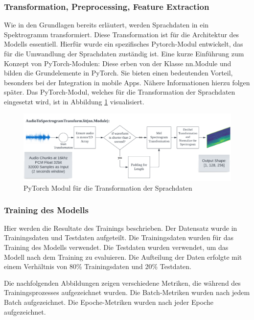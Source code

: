 \documentclass[11pt,a4paper]{article}
\begin{document}
\subsubsection{Transformation, Preprocessing, Feature Extraction}
Wie in den Grundlagen bereits erläutert, werden Sprachdaten in ein Spektrogramm transformiert. 
Diese Transformation ist für die Architektur des Modells essentiell. Hierfür wurde ein spezifisches 
Pytorch-Modul entwickelt, das für die Umwandlung der Sprachdaten zuständig ist. Eine kurze 
Einführung zum Konzept von PyTorch-Modulen: Diese erben von der Klasse nn.Module und bilden die 
Grundelemente in PyTorch. Sie bieten einen bedeutenden Vorteil, besonders bei der Integration in 
mobile Apps. Nähere Informationen hierzu folgen später. Das PyTorch-Modul, welches für die 
Transformation der Sprachdaten eingesetzt wird, ist in Abbildung \ref{fig:transform} visualisiert.

\begin{figure}[H]
	\centering
	\includegraphics[width=1.0\linewidth]{img/transform.pdf}
	\caption{PyTorch Modul für die Transformation der Sprachdaten}
	\label{fig:transform}
\end{figure}


\subsubsection{Training des Modells}
Hier werden die Resultate des Trainings beschrieben. Der Datensatz wurde in Trainingsdaten und 
Testdaten aufgeteilt. Die Trainingsdaten wurden für das Training des Modells verwendet. 
Die Testdaten wurden verwendet, um das Modell nach dem Training zu evaluieren. Die Aufteilung der 
Daten erfolgte mit einem Verhältnis von 80\% Trainingsdaten und 20\% Testdaten.

\noindent \newline
Die nachfolgenden Abbildungen zeigen verschiedene Metriken, die während des Trainingsprozesses 
aufgezeichnet wurden. Die Batch-Metriken wurden nach jedem Batch aufgezeichnet. Die Epoche-Metriken 
wurden nach jeder Epoche aufgezeichnet.
\end{document}
